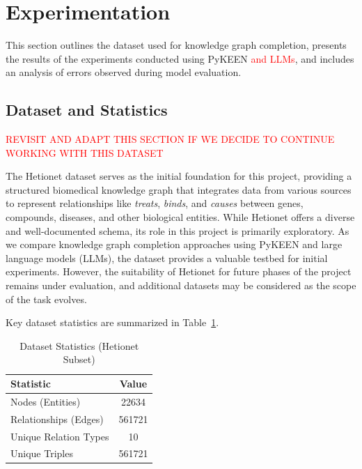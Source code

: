 \section*{Experimentation}


This section outlines the dataset used for knowledge graph completion, presents the results of the experiments conducted using PyKEEN \textcolor{red}{and LLMs}, and includes an analysis of errors observed during model evaluation.

\subsection*{Dataset and Statistics}

\textcolor{red}{REVISIT AND ADAPT THIS SECTION IF WE DECIDE TO CONTINUE WORKING WITH THIS DATASET}

The Hetionet dataset \cite{hetionet} serves as the initial foundation for this project, providing a structured biomedical knowledge graph that integrates data from various sources to represent relationships like \textit{treats}, \textit{binds}, and \textit{causes} between genes, compounds, diseases, and other biological entities. While Hetionet offers a diverse and well-documented schema, its role in this project is primarily exploratory. As we compare knowledge graph completion approaches using PyKEEN and large language models (LLMs), the dataset provides a valuable testbed for initial experiments. However, the suitability of Hetionet for future phases of the project remains under evaluation, and additional datasets may be considered as the scope of the task evolves.

Key dataset statistics are summarized in Table~\ref{tab:dataset_stats}.

\begin{table}[ht]
    \centering
    \caption{Dataset Statistics (Hetionet Subset)}
    \begin{tabular}{l c}
        \hline
        \textbf{Statistic}    & \textbf{Value} \\
        \hline
        Nodes (Entities)      & 22634          \\ %
        Relationships (Edges) & 561721         \\ %
        Unique Relation Types & 10             \\ %
        Unique Triples        & 561721         \\ %
        \hline
    \end{tabular}
    \label{tab:dataset_stats}
\end{table}

